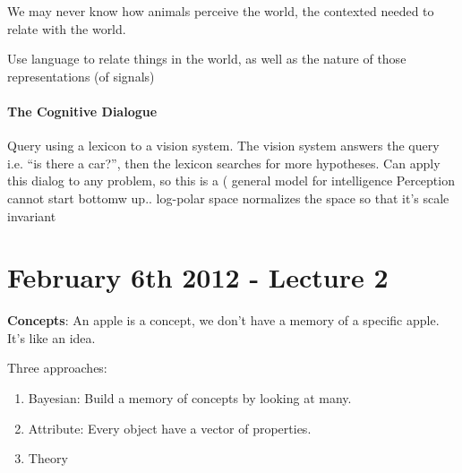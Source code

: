 We may never know how animals perceive the world, the contexted needed
to relate with the world. 

Use language to relate things in the world, as well as the nature of
those representations (of signals)

\paragraph{The Cognitive Dialogue}

Query using a lexicon to a vision system. The vision system answers
the query i.e. ``is there a car?'', then the lexicon searches for more
hypotheses. 
Can apply this dialog to any problem, so this is a ( general model for
intelligence
Perception cannot start bottomw up..
log-polar space normalizes the space so that it's scale invariant

\section{February 6th 2012 - Lecture 2}
\label{sec:lecture-2}
\textbf{Concepts}: An apple is a concept, we don't have a memory of a
specific apple. It's like an idea.

Three approaches:
\begin{enumerate}
\item Bayesian: Build a memory of concepts by looking at many.
\item Attribute: Every object have a vector of properties.
\item Theory
\end{enumerate}


 
